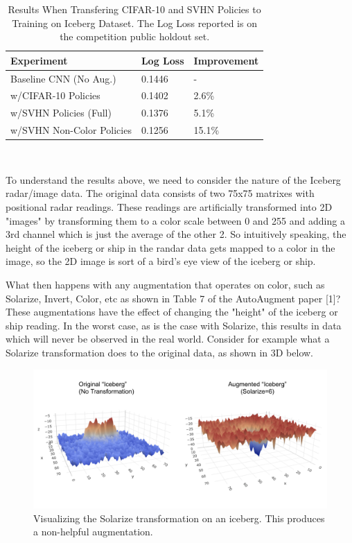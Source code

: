 \documentclass[10pt,twocolumn,letterpaper]{article}
\begin{document}
    \begin{table}[h]
      \begin{tabular}{lll}
        \hline
        Experiment &Log Loss & Improvement   \\ \hline
        Baseline CNN (No Aug.)  &0.1446 &-\\
        w/CIFAR-10 Policies &0.1402  & 2.6\%\\
        w/SVHN Policies (Full) &0.1376  & 5.1\%\\
        w/SVHN Non-Color Policies &0.1256  &15.1\%\\  
        \hline
      \end{tabular}
      \\
      \caption{Results When Transfering CIFAR-10 and SVHN Policies to Training on Iceberg Dataset.  The Log Loss reported is on the competition public holdout set.}
    \end{table}


To understand the results above, we need to consider the nature of the Iceberg radar/image data.  The original data consists of two 75x75 matrixes with positional radar readings.  These readings are artificially transformed into 2D "images" by transforming them to a color scale between 0 and 255 and adding a 3rd channel which is just the average of the other 2.  So intuitively speaking, the height of the iceberg or ship in the randar data gets mapped to a color in the image, so the 2D image is sort of a bird's eye view of the iceberg or ship.

What then happens with any augmentation that operates on color, such as Solarize, Invert, Color, etc as shown in Table 7 of the AutoAugment paper [1]?  These augmentations have the effect of changing the "height" of the iceberg or ship reading.  In the worst case, as is the case with Solarize, this results in data which will never be observed in the real world.  Consider for example what a Solarize transformation does to the original data, as shown in 3D below.


\begin{figure}[bhp]
\includegraphics[width=\columnwidth]{iceberg_solarize.png}
\caption{Visualizing the Solarize transformation on an iceberg. This produces a non-helpful augmentation.}
\end{figure}
\end{document}
